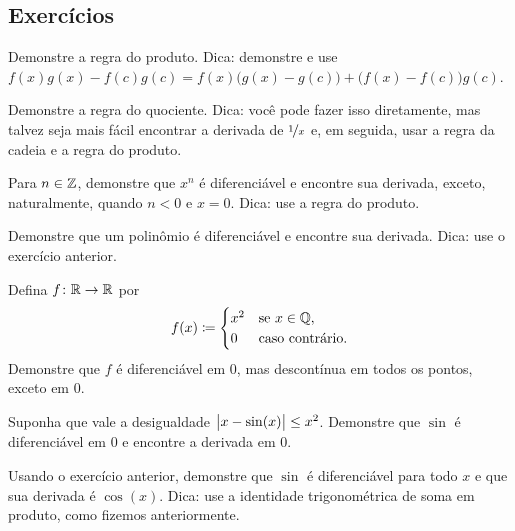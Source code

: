 \subsection{Exercícios}

\begin{exercise}
Demonstre a regra do produto.
Dica: demonstre e use
$f(x) g(x) - f(c) g(c) = f(x)\bigl( g(x) - g(c) \bigr) + \bigl( f(x) -
f(c) \bigr) g(c)$.
\end{exercise}

\begin{exercise}
Demonstre a regra do quociente. Dica: você pode fazer isso diretamente, mas
talvez seja mais fácil encontrar a derivada de $\nicefrac{1}{x}$ e, em seguida,
usar a regra da cadeia e a regra do produto.
\end{exercise}

\begin{exercise} \label{exercise:diffofxn}
Para $n \in {\mathbb{Z}}$, demonstre que $x^n$ é diferenciável e encontre sua derivada,
exceto, naturalmente, quando $n < 0$ e $x=0$.
Dica: use a regra do produto.
\end{exercise}

\begin{exercise}
Demonstre que um polinômio é diferenciável e encontre sua derivada.
Dica: use o exercício anterior.
\end{exercise}

\begin{exercise}
Defina $f \colon {\mathbb{R}} \to {\mathbb{R}}$ por
\begin{equation*}
f(x) \coloneqq
\begin{cases}
x^2 & \text{se } x \in {\mathbb{Q}},\\
0 & \text{caso contrário.}
\end{cases}
\end{equation*}
Demonstre que $f$ é diferenciável em $0$, mas descontínua em todos os pontos,
exceto em $0$.
\end{exercise}

\begin{exercise}
Suponha que vale a desigualdade $\bigl\lvert {x-\sin(x)} \bigr\rvert \leq x^2$. Demonstre que
$\sin$ é diferenciável em $0$ e encontre a derivada em $0$.
\end{exercise}

\begin{exercise}
Usando o exercício anterior, demonstre que $\sin$ é diferenciável para todo $x$
e que sua derivada é $\cos(x)$. Dica: use a identidade trigonométrica
de soma em produto, como fizemos anteriormente.
\end{exercise}

